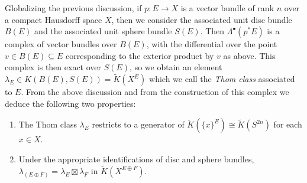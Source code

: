 \documentclass[12pt,a4paper]{amsart}
\theoremstyle{plain}
\theoremstyle{definition}
\theoremstyle{remark}
\begin{document}
Globalizing the previous discussion, if $p \colon E \to X$ is a vector bundle of rank $n$ over a compact Hausdorff space $X$, then we consider the associated unit disc bundle $B(E)$ and the associated unit sphere bundle $S(E)$.
Then $\Lambda^{\bullet}(p^{*}E)$ is a complex of vector bundles over $B(E)$, with the differential over the point $v \in B(E) \subseteq E$ corresponding to the exterior product by $v$ as above.
This complex is then exact over $S(E)$, so we obtain an element $\lambda_{E} \in K(B(E),S(E)) = \tilde{K}(X^{E})$ which we call the \textit{Thom class} associated to $E$.
From the above discussion and from the construction of this complex we deduce the following two properties:

\begin{enumerate}[label=(\Alph*)]
  \item The Thom class $\lambda_{E}$ restricts to a generator of $\tilde{K}(\{ x \}^{E}) \cong \tilde{K}(S^{2n})$ for each $x \in X$.
  \item Under the appropriate identifications of disc and sphere bundles, $\lambda_{(E \oplus F)} = \lambda_{E} \boxtimes \lambda_{F}$ in $\tilde{K}(X^{E \oplus F})$.
\end{enumerate}
\end{document}
